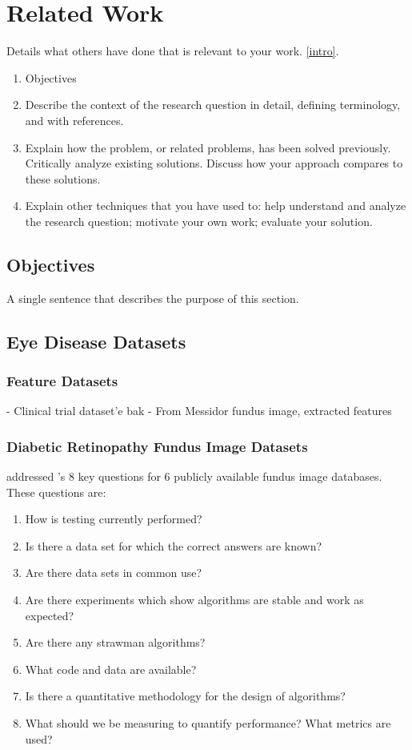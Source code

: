 \chapter{Related Work} \label{related_work}

Details what others have done that is relevant to your work. \ref{intro}.
\begin{enumerate}
    \item Objectives
    \item Describe the context of the research question in detail, defining terminology, and with references.
    \item Explain how the problem, or related problems, has been solved previously. Critically analyze existing solutions. Discuss how your approach compares to these solutions.
    \item Explain other techniques that you have used to: help understand and analyze the research question; motivate your own work; evaluate your solution.
\end{enumerate}
\section{Objectives}
A single sentence that describes the purpose of this section.
\section{Eye Disease Datasets}
\subsection{Feature Datasets}
- Clinical trial dataset'e bak
- From Messidor fundus image, extracted features 
\subsection{Diabetic Retinopathy Fundus Image Datasets}

\citet{kauppi2013constructing} addressed \citet{thacker2008performance}'s 8 key questions for 6 publicly available fundus image databases. These questions are:

\begin{enumerate}
    \item How is testing currently performed?
    \item Is there a data set for which the correct answers are known?
    \item Are there data sets in common use?
    \item Are there experiments which show algorithms are stable and work as expected?
    \item Are there any strawman algorithms?
    \item What code and data are available?
    \item Is there a quantitative methodology for the design of algorithms?
    \item What should we be measuring to quantify performance? What metrics are used?
\end{enumerate}

